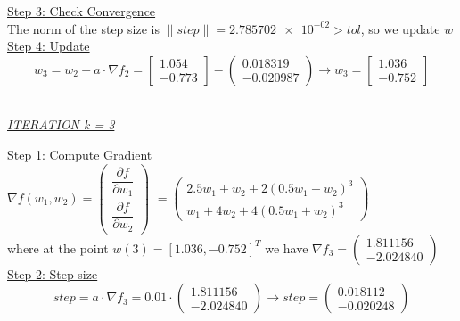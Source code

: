 \underline{Step 3: Check Convergence}\\
The norm of the step size is $\| step \| = \num{2.785702e-02} > tol$, so we update $w$
\\[4mm]

\underline{Step 4: Update}
\[ 
w_3 = w_2 - a\cdot \nabla f_2 =  \left[\begin{array}{c}
	1.054 \\
	-0.773
\end{array}\right] - \left(\begin{array}{c}
	0.018319 \\
-0.020987
\end{array}\right) \rightarrow
w_3 = \left[\begin{array}{c}
	1.036\\
	-0.752
\end{array}\right]
\]
\\[4mm]

\begin{center}
	\underline{\textit{ITERATION k = 3}}
\end{center}

\underline{Step 1: Compute Gradient}\\
\(\nabla f(w_1,w_2) = \left(\begin{array}{c}
	\dfrac{\partial f}{\partial w_1} \\[4mm]
	\dfrac{\partial f}{\partial w_2}
\end{array}\right)\) $= \left(\begin{array}{c}
	2.5w_1 + w_2 + 2(0.5w_1+w_2)^3\\[1mm]
	w_1 + 4w_2 + 4(0.5w_1+w_2)^3
\end{array}\right)$ \\[3mm]

where at the point $w\left(3\right) = \left[1.036, -0.752\right]^T$ we have $\nabla f_{3} = \left(\begin{array}{c}
	1.811156 \\
	-2.024840
\end{array}\right)$
\\[4mm]

\underline{Step 2: Step size}
\[
step = a \cdot \nabla f_{3} = 0.01 \cdot \left(\begin{array}{c}
	1.811156 \\
-2.024840
\end{array}\right) \rightarrow step =\left(\begin{array}{c}
	0.018112 \\
	-0.020248
\end{array}\right)
\]
\\[4mm]

